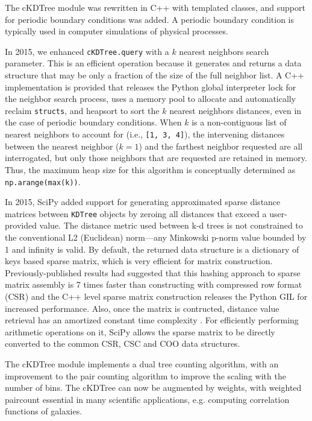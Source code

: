 The cKDTree module was rewritten in C++ with templated classes, and support for
periodic boundary conditions was added. A periodic boundary condition is typically 
used in computer simulations of physical processes.

In 2015, we enhanced \texttt{cKDTree.query} with a $k$ nearest neighbors search
parameter. This is an efficient operation\cite{Sproull:1991:RNS:3118219.3118331} 
because it generates and returns a data structure that may be only a fraction 
of the size of the full neighbor list. A C++ implementation is provided that releases
the Python global interpreter lock for the neighbor search process, uses
a memory pool to allocate and automatically reclaim \texttt{structs}, and
heapsort to sort the $k$ nearest neighbors distances, even in the case
of periodic boundary conditions. When $k$ is a non-contiguous list of nearest
neighbors to account for (i.e., \texttt{[1, 3, 4]}), the intervening distances
between the nearest neighbor ($k = 1$) and the farthest neighbor requested
are all interrogated, but only those neighbors that are requested are retained
in memory. Thus, the maximum heap size for this algorithm is conceptually determined
as \texttt{np.arange(max(k))}.

In 2015, SciPy added support for generating approximated sparse distance matrices 
between \texttt{KDTree} objects by zeroing all distances that exceed a user-provided value. 
The distance metric used between k-d trees is not constrained to the 
conventional L2 (Euclidean) norm---any Minkowski p-norm value bounded by 1 and 
infinity is valid. By default, the returned data structure is a dictionary of 
keys based sparse matrix, which is very efficient for matrix construction. 
Previously-published results had suggested that this hashing approach to sparse 
matrix assembly is 7 times faster than constructing with compressed row format (CSR)
\cite{10.1007/978-3-540-75755-9_107} and the C++ level sparse matrix construction 
releases the Python GIL for increased performance. Also, once the matrix is 
contructed, distance value retrieval has an amortized constant time complexity 
\cite{Cormen:2001:IA:580470}. For efficiently performing arithmetic operations 
on it, SciPy allows the sparse matrix to be directly converted to the common 
CSR, CSC and COO data structures.

The cKDTree module implements a dual tree counting algorithm\cite{Moore2000ar},
with an improvement to the pair counting algorithm to improve the scaling
with the number of bins. The cKDTree can now be augmented by weights, with 
weighted paircount essential in many scientific applications, e.g. computing 
correlation functions of galaxies\cite{0004-637X-750-1-38}.

